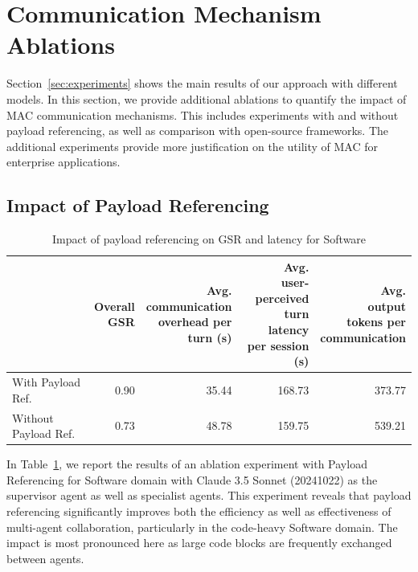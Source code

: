 \section{Communication Mechanism Ablations}
\label{sec:ablations}

Section~\ref{sec:experiments} shows the main results of our approach with different models. In this section, we provide additional ablations to quantify the impact of MAC communication mechanisms. This includes experiments with and without payload referencing, as well as comparison with open-source frameworks.  The additional experiments provide more justification on the utility of MAC for enterprise applications.

\subsection{Impact of Payload Referencing}
\label{sec:ablations-payload}

\begin{table}[t]
    \caption{Impact of payload referencing on GSR and latency for Software}
    \label{tab:payload_ref}
    \centering
    \footnotesize
    \begin{tabular}{lrrrr}
    \toprule
     & \shortstack[r]{Overall \\ GSR} & \shortstack[r]{Avg. \\ communication \\ overhead per \\ turn (s)} & \shortstack[r]{Avg. \\ user-perceived \\ turn latency \\ per session (s)} & \shortstack[r]{Avg. \\ output \\ tokens per \\ communication} \\
    \midrule 
    With Payload Ref. & 0.90 & 35.44 & 168.73 & 373.77 \\
    Without Payload Ref. & 0.73 & 48.78 & 159.75 & 539.21 \\
    \bottomrule
    \end{tabular}
\end{table}

In Table~\ref{tab:payload_ref}, we report the results of an ablation experiment with Payload Referencing for Software domain with Claude 3.5 Sonnet (20241022) as the supervisor agent as well as specialist agents. This experiment reveals that payload referencing significantly improves both the efficiency as well as effectiveness of multi-agent collaboration, particularly in the code-heavy Software domain. The impact is most pronounced here as large code blocks are frequently exchanged between agents.

